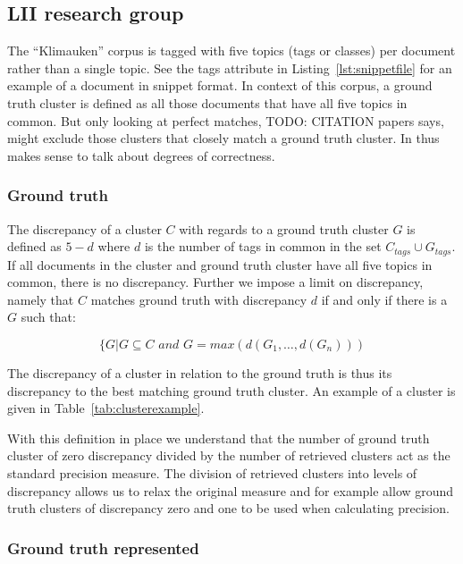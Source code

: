 \subsection{LII research group}
The ``Klimauken'' corpus is tagged with five topics (tags or classes) per document rather than a single topic. See the tags attribute in Listing~\ref{lst:snippetfile} for an example of a document in snippet format. In context of this corpus, a ground truth cluster is defined as all those documents that have all five topics in common. But only looking at perfect matches, TODO: CITATION papers says, might exclude those clusters that closely match a ground truth cluster. In thus makes sense to talk about degrees of correctness. 

\subsubsection{Ground truth}

The discrepancy of a cluster \(C\) with regards to a ground truth cluster \(G\) is defined as \(5 - d\) where \(d\) is the number of tags in common in the set \(C_{tags} \cup G_{tags}\). If all documents in the cluster and ground truth cluster have all five topics in common, there is no discrepancy. Further we impose a limit on discrepancy, namely that \(C\) matches ground truth with discrepancy \(d\) if and only if there is a \(G\) such that:

\begin{displaymath}
\{ G \vert G \subseteq C \textit{ and } G = max(d(G_{1}, \dots, d(G_{n})))
\end{displaymath}

The discrepancy of a cluster in relation to the ground truth is thus its discrepancy to the best matching ground truth cluster. An example of a cluster is given in Table~\ref{tab:clusterexample}.

With this definition in place we understand that the number of ground truth cluster of zero discrepancy divided by the number of retrieved clusters act as the standard precision measure. The division of retrieved clusters into levels of discrepancy allows us to relax the original measure and for example allow ground truth clusters of discrepancy zero and one to be used when calculating precision.

\subsubsection{Ground truth represented}

